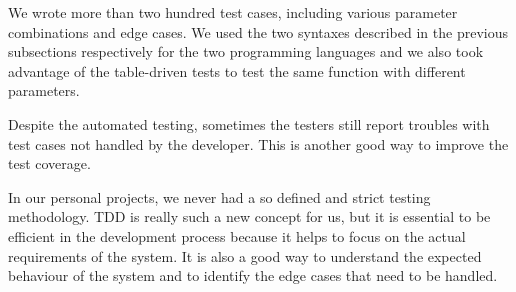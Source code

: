 We wrote more than two hundred test cases, including various parameter combinations and edge cases. We used the two syntaxes described in the previous subsections respectively for the two programming languages and we also took advantage of the table-driven tests to test the same function with different parameters.

Despite the automated testing, sometimes the testers still report troubles with test cases not handled by the developer. This is another good way to improve the test coverage.

In our personal projects, we never had a so defined and strict testing methodology. TDD is really such a new concept for us, but it is essential to be efficient in the development process because it helps to focus on the actual requirements of the system. It is also a good way to understand the expected behaviour of the system and to identify the edge cases that need to be handled.
